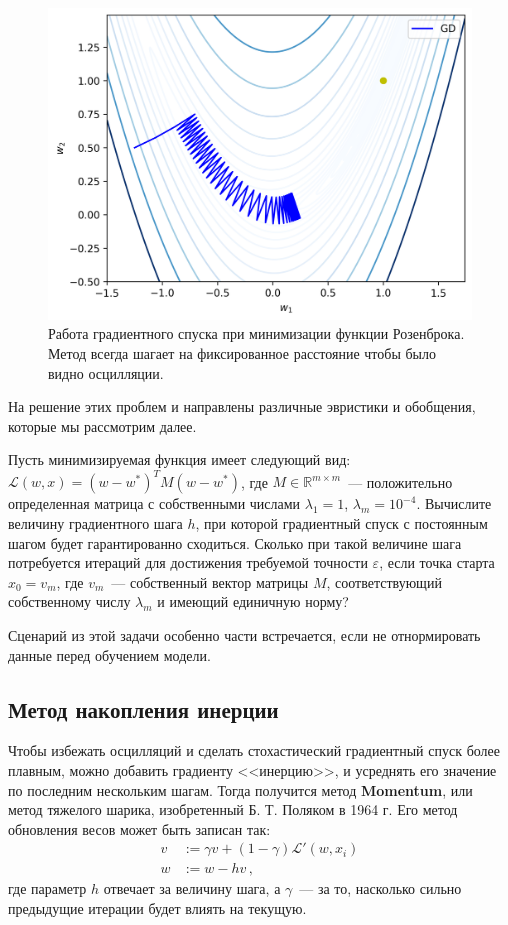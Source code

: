 \begin{figure}[h]
	\centering
	\includegraphics[width=0.6\linewidth]{chapters/neural/images/gd_oscillating.png}
	\caption{Работа градиентного спуска при минимизации функции Розенброка. Метод всегда шагает на фиксированное расстояние чтобы было видно осцилляции.}
	\label{img:gd_osc}
\end{figure}

На решение этих проблем и направлены различные эвристики и обобщения, которые мы рассмотрим далее.

\begin{problem}
Пусть минимизируемая функция имеет следующий вид: $\mathcal{L}(w, x) = (w - w^*)^T M (w - w^*)$, где $M \in \mathbb{R}^{m \times m}$~--- положительно определенная матрица с собственными числами $\lambda_1 = 1$, $\lambda_m = 10^{-4}$. Вычислите величину градиентного шага  $h$, при которой градиентный спуск с постоянным шагом будет гарантированно сходиться. Сколько при такой величине шага потребуется итераций для достижения требуемой точности $\varepsilon$, если точка старта $x_0 = v_m$, где $v_m$~--- собственный вектор матрицы $M$, соответствующий собственному числу $\lambda_m$ и имеющий единичную норму?
\end{problem}

\begin{remark}
Сценарий из этой задачи особенно части встречается, если не отнормировать данные перед обучением модели. 
\end{remark}

\subsection{Метод накопления инерции}

Чтобы избежать осцилляций и сделать стохастический градиентный спуск более плавным, можно добавить градиенту <<инерцию>>, и усреднять его значение по последним нескольким шагам. Тогда получится метод \textbf{Momentum}, или метод тяжелого шарика, изобретенный Б. Т. Поляком в 1964 г. Его метод обновления весов может быть записан так:
\begin{align*}
v &:= \gamma v + (1 - \gamma) \mathcal{L}'(w, x_i) \\
w &:= w - h v\,,
\end{align*}
где параметр $h$ отвечает за величину шага, а $\gamma$~--- за то, насколько сильно предыдущие итерации будет влиять на текущую.

